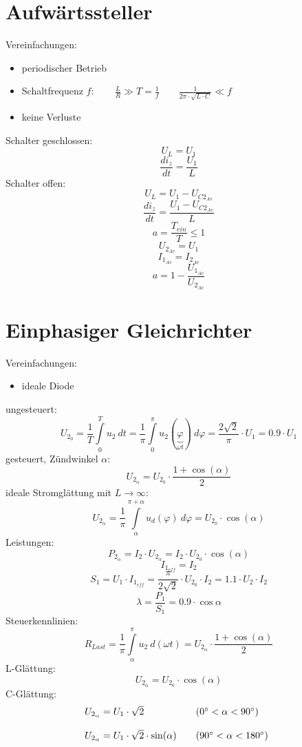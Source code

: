 \newpage
\section{Aufwärtssteller}
Vereinfachungen: 
\begin{itemize}
  \item periodischer Betrieb
  \item Schaltfrequenz $f: \qquad\frac{L}{R} \gg T = \frac{1}{f} 
        \qquad \frac{1}{2 \pi \cdot \sqrt{L \cdot C}} \ll f$
  \item keine Verluste
\end{itemize}
Schalter geschlossen: 
\[ U_L = U_1 \]
\[ \frac{d i_z}{d t} = \frac{U_1}{L} \]
Schalter offen: 
\[ U_L = U_1 - U_{C2_{Av}} \]
\[ \frac{d i_z}{d t} = \frac{U_1 - U_{C2_{Av}}}{L} \]
\[ a = \frac{T_{ein}}{T} \leq 1 \]
\[ U_{2_{Av}} = U_1 \]
\[ I_{1_{Av}} = I_{2_{Av}} \]
\[ a = 1 - \frac{U_{1_{Av}}}{U_{2_{Av}}} \]

\newpage
\section{Einphasiger Gleichrichter}
Vereinfachungen: 
\begin{itemize}
  \item ideale Diode
\end{itemize}
ungesteuert: 
\[ U_{2_0} = \frac{1}{T} \int\limits_0^T u_2 ~dt = \frac{1}{\pi} 
\int\limits_0^\pi u_2 (\underbrace{\varphi}_{\omega t}) ~ d\varphi 
= \frac{2 \sqrt{2}}{\pi} \cdot U_1 = 0.9 \cdot U_1 \]
gesteuert, Zündwinkel $\alpha$:
\[ U_{2_\alpha} = U_{2_0} \cdot \frac{1 + \cos(\alpha)}{2} \]
ideale Stromglättung mit $L \to \infty$: 
\[ U_{2_\alpha} = \frac{1}{\pi} \int\limits_\alpha^{\pi + \alpha} u_d(\varphi) 
~ d \varphi = U_{2_0} \cdot \cos(\alpha) \]
Leistungen: 
\[ P_{2_\alpha} = I_2 \cdot U_{2_\alpha} 
= I_2 \cdot U_{2_0} \cdot \cos(\alpha) \]
\[ I_{1_{eff}} = I_2 \]
\[ S_1 = U_1 \cdot I_{1_{eff}} 
= \frac{\pi}{2 \sqrt{2}} \cdot U_{2_0} \cdot I_2 = 1.1 \cdot U_2 \cdot I_2 \]
\[ \lambda = \frac{P_1}{S_1} = 0.9 \cdot \cos{\alpha} \]
Steuerkennlinien: 
\[ R_{Last} = \frac{1}{\pi} \int\limits_\alpha^\pi u_2 ~ d(\omega t) 
= U_{2_\alpha} \cdot \frac{1 + \cos(\alpha)}{2} \]
L-Glättung: 
\[ U_{2_\alpha} = U_{2_0} \cdot \cos(\alpha) \]
C-Glättung: 
\[ \begin{array}{@{}l@{}l}
U_{2_\alpha} = U_1 \cdot \sqrt{2} & \qquad (0^\circ < \alpha < 90^\circ) \\\\
U_{2_\alpha} = U_1 \cdot \sqrt{2} \cdot \sin(\alpha) 
& \qquad (90^\circ < \alpha < 180^\circ) \\
\end{array} \]


